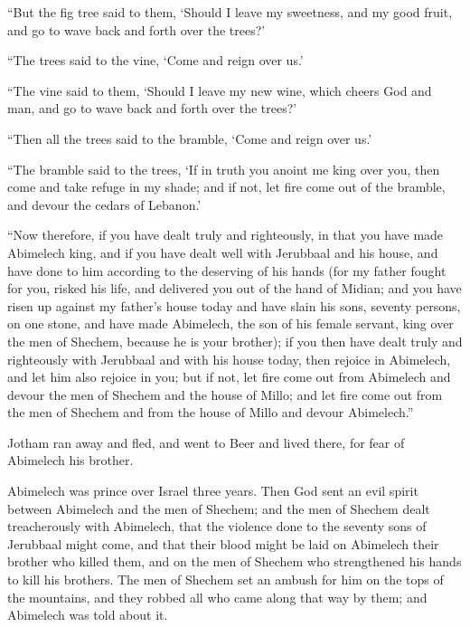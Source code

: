 {\par }{\PP {}“But the fig tree said to them, ‘Should I leave my sweetness, and my good fruit, and go to wave back and forth over the trees?’
\par }{\PP {}“The trees said to the vine, ‘Come and reign over us.’
\par }{\PP {}“The vine said to them, ‘Should I leave my new wine, which cheers God and man, and go to wave back and forth over the trees?’
\par }{\PP {}“Then all the trees said to the bramble, ‘Come and reign over us.’
\par }{\PP {}“The bramble said to the trees, ‘If in truth you anoint me king over you, then come and take refuge in my shade; and if not, let fire come out of the bramble, and devour the cedars of Lebanon.’
\par }{\PP {}“Now therefore, if you have dealt truly and righteously, in that you have made Abimelech king, and if you have dealt well with Jerubbaal and his house, and have done to him according to the deserving of his hands
(for my father fought for you, risked his life, and delivered you out of the hand of Midian;
and you have risen up against my father’s house today and have slain his sons, seventy persons, on one stone, and have made Abimelech, the son of his female servant, king over the men of Shechem, because he is your brother);
if you then have dealt truly and righteously with Jerubbaal and with his house today, then rejoice in Abimelech, and let him also rejoice in you;
but if not, let fire come out from Abimelech and devour the men of Shechem and the house of Millo; and let fire come out from the men of Shechem and from the house of Millo and devour Abimelech.”
\par }{\PP {}Jotham ran away and fled, and went to Beer and lived there, for fear of Abimelech his brother.
\par }{\PP {}Abimelech was prince over Israel three years.
Then God sent an evil spirit between Abimelech and the men of Shechem; and the men of Shechem dealt treacherously with Abimelech,
that the violence done to the seventy sons of Jerubbaal might come, and that their blood might be laid on Abimelech their brother who killed them, and on the men of Shechem who strengthened his hands to kill his brothers.
The men of Shechem set an ambush for him on the tops of the mountains, and they robbed all who came along that way by them; and Abimelech was told about it.
}
